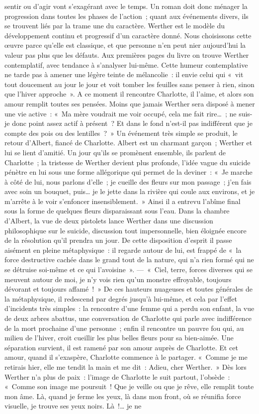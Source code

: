 \documentclass[french,twoside]{book} %
\begin{document}
sentir ou d’agir vont s’exagérant avec le temps. Un roman doit donc ménager la progression dans toutes les phases de l’action ; quant aux événements divers, ils se trouvent liés par la trame une du caractère. Werther est le modèle du développement continu et progressif d’un caractère donné. Nous choisissons cette œuvre parce qu’elle est classique, et que personne n’en peut nier aujourd’hui la valeur pas plus que les défauts. Aux premières pages du livre on trouve Werther contemplatif, avec tendance à s’analyser lui-même. Cette humeur contemplative ne tarde pas à amener une légère teinte de mélancolie : il envie celui qui « vit tout doucement au jour le jour et voit tomber les feuilles sans penser à rien, sinon que l’hiver approche ». A ce moment il rencontre Charlotte, il l’aime, et alors son amour remplit toutes ses pensées. Moins que jamais Werther sera disposé à mener une vie active : « Ma mère voudrait me voir occupé, cela me fait rire… ; ne suis-je donc point assez actif à présent ? Et dans le fond n’est-il pas indifférent que je compte des pois ou des lentilles ? » Un événement très simple se produit, le retour d’Albert, fiancé de Charlotte. Albert est un charmant garçon ; Werther et lui se lient d’amitié. Un jour qu’ils se promènent ensemble, ils parlent de Charlotte ; la tristesse de Werther devient plus profonde, l’idée vague du suicide pénètre en lui sous une forme allégorique qui permet de la deviner : « Je marche à côté de lui, nous parlons d’elle ; je cueille des fleurs sur mon passage ; j’en fais avec soin un bouquet, puis… je le jette dans la rivière qui coule aux environs, et je m’arrête à le voir s’enfoncer insensiblement. » Ainsi il a entrevu l’abîme final sous la forme de quelques fleurs disparaissant sous l’eau. Dans la chambre d’Albert, la vue de deux pistolets lance Werther dans une discussion philosophique sur le suicide, discussion tout impersonnelle, bien éloignée encore de la résolution qu’il prendra un jour. De cette disposition d’esprit il passe aisément en pleine métaphysique : il regarde autour de lui, est frappé de « la force destructive cachée dans le grand tout de la nature, qui n’a rien formé qui ne se détruise soi-même et ce qui l’avoisine ». — « Ciel, terre, forces diverses qui se meuvent autour de moi, je n’y vois rien qu’un monstre effroyable, toujours dévorant et toujours affamé ! » De ces hauteurs nuageuses et toutes générales de la métaphysique, il redescend par degrés jusqu’à lui-même, et cela par l’effet d’incidents très simples : la rencontre d’une femme qui a perdu son enfant, la vue de deux arbres abattus, une conversation de Charlotte qui parle avec indifférence de la mort prochaine d’une personne ; enfin il rencontre un pauvre fou qui, au milieu de l’hiver, croit cueillir les plus belles fleurs pour sa bien-aimée. Une séparation survient, il est ramené par son amour auprès de Charlotte. Et cet amour, quand il s’exaspère, Charlotte commence à le partager. « Comme je me retirais hier, elle me tendit la main et me dit : Adieu, cher Werther. » Dès lors Werther n’a plus de paix : l’image de Charlotte le suit partout, l’obsède : « Comme son image me poursuit ! Que je veille ou que je rêve, elle remplit toute mon âme. Là, quand je ferme les yeux, là dans mon front, où se réunifia force visuelle, je trouve ses yeux noirs. Là !… je ne 
\end{document}
